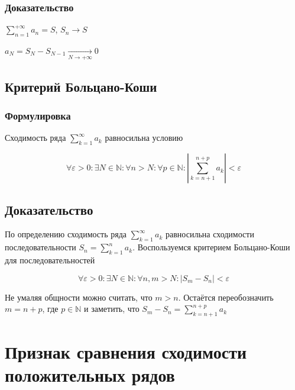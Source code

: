 \documentclass{article}
\begin{document}
            \subsubsection{Доказательство}
            
                $\sum\limits^{+\infty}_{n = 1} a_n = S$, $S_n \rightarrow S$
                
                $a_N = S_N - S_{N - 1} \xrightarrow[N \rightarrow +\infty]{} 0$
                
        \subsection{Критерий Больцано-Коши}
        
            \subsubsection{Формулировка}
            
                Сходимость ряда $\sum\limits^{\infty}_{k = 1} a_k$ равносильна условию
            
                $$\forall \varepsilon > 0 : \exists N \in \mathbb{N} : \forall n > N : \forall p \in \mathbb{N} : \left| \sum\limits^{n + p}_{k = n + 1} a_k \right| < \varepsilon$$
            
            \subsection{Доказательство}
            
                По определению сходимость ряда $\sum\limits^{\infty}_{k = 1} a_k$ равносильна сходимости последовательности $S_n = \sum\limits^n_{k = 1} a_k$. Воспользуемся критерием Больцано-Коши для последовательностей 
                
                $$\forall \varepsilon > 0 : \exists N \in \mathbb{N} : \forall n, m > N : |S_m - S_n| < \varepsilon$$
                
                Не умаляя общности можно считать, что $m > n$. Остаётся переобозначить $m = n + p$, где $p \in \mathbb{N}$ и заметить, что $S_m - S_n = \sum\limits^{n+p}_{k = n + 1} a_k$
                
    \newpage
    
    \section{Признак сравнения сходимости положительных рядов}
    
\end{document}
